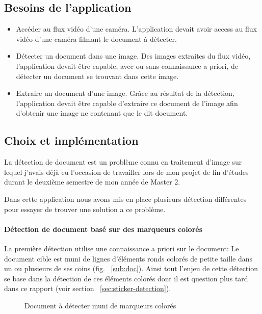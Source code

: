 \subsection{Besoins de l'application}
\label{subsec:doc:content}
\begin{itemize}
\item Accéder au flux vidéo d'une caméra. L'application devait avoir access au flux vidéo d'une caméra filmant le document à détecter.
\item Détecter un document dans une image. Des images extraites du flux vidéo, l'application devait être capable, avec ou sans connaissance a priori, de détecter un document se trouvant dans cette image.
\item Extraire un document d'une image. Grâce au résultat de la détection, l'application devait être capable d'extraire ce document de l'image afin d'obtenir une image ne contenant que le dit document.
\end{itemize}

\subsection{Choix et implémentation}
\label{subsec:doc:impl}

La détection de document est un problème connu en traitement d'image sur lequel j'avais déjà eu l'occasion de travailler lors de mon projet de fin d'études durant le deuxième semestre de mon année de Master 2.

Dans cette application nous avons mis en place plusieurs détection différentes pour essayer de trouver une solution a ce problème.

\paragraph{Détection de document basé sur des marqueurs colorés} La première détection utilise une connaissance a priori sur le document: Le document cible est muni de lignes d'éléments ronds colorés de petite taille dans un ou plusieurs de ses coins (fig. ~\ref{sub:doc}). Ainsi tout l'enjeu de cette détection se base dans la détection de ces éléments colorés dont il est question plus tard dans ce rapport (voir section ~\ref{sec:sticker-detection}).

\begin{figure}
\caption{Document à détecter muni de marqueurs colorés}
\label{fig:doc-detection:coloredsticker}
\end{figure}

